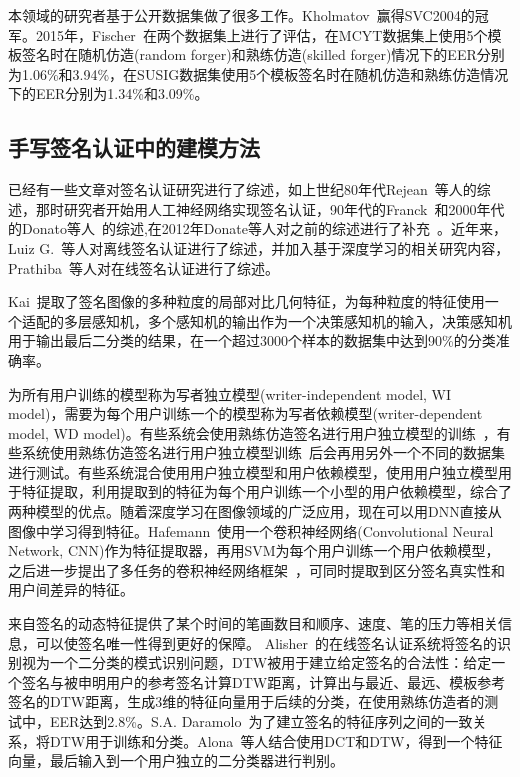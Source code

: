 本领域的研究者基于公开数据集做了很多工作。Kholmatov~\cite{kholmatov2005identity}赢得SVC2004的冠军。2015年，Fischer~\cite{fischer2015robust}在两个数据集上进行了评估，在MCYT数据集上使用5个模板签名时在随机仿造(random forger)和熟练仿造(skilled forger)情况下的EER分别为1.06\%和3.94\%，在SUSIG数据集使用5个模板签名时在随机仿造和熟练仿造情况下的EER分别为1.34\%和3.09\%。

\subsection{手写签名认证中的建模方法}

已经有一些文章对签名认证研究进行了综述，如上世纪80年代Rejean~\cite{plamondon1989automatic}等人的综述，那时研究者开始用人工神经网络实现签名认证，90年代的Franck~\cite{leclerc1994automatic}和2000年代的Donato等人~\cite{impedovo2008automatic}的综述,在2012年Donate等人对之前的综述进行了补充~\cite{impedovo2012handwritten}。近年来，Luiz G.~\cite{hafemann2017offline}等人对离线签名认证进行了综述，并加入基于深度学习的相关研究内容，Prathiba~\cite{prathiba2014online}等人对在线签名认证进行了综述。

Kai~\cite{huang1997off}提取了签名图像的多种粒度的局部对比几何特征，为每种粒度的特征使用一个适配的多层感知机，多个感知机的输出作为一个决策感知机的输入，决策感知机用于输出最后二分类的结果，在一个超过3000个样本的数据集中达到90\%的分类准确率。

为所有用户训练的模型称为写者独立模型(writer-independent model, WI model)，需要为每个用户训练一个的模型称为写者依赖模型(writer-dependent model, WD model)。有些系统会使用熟练仿造签名进行用户独立模型的训练~\cite{rivard2013multi,eskander2013hybrid}，有些系统使用熟练仿造签名进行用户独立模型训练~\cite{yilmaz2016score,rantzsch2016signature,hafemann2017learning}后会再用另外一个不同的数据集进行测试。有些系统混合使用用户独立模型和用户依赖模型，使用用户独立模型用于特征提取，利用提取到的特征为每个用户训练一个小型的用户依赖模型，综合了两种模型的优点。随着深度学习在图像领域的广泛应用，现在可以用DNN直接从图像中学习得到特征。Hafemann~\cite{hafemann2016writer}使用一个卷积神经网络(Convolutional Neural Network, CNN)作为特征提取器，再用SVM为每个用户训练一个用户依赖模型，之后进一步提出了多任务的卷积神经网络框架~\cite{hafemann2017learning}，可同时提取到区分签名真实性和用户间差异的特征。

来自签名的动态特征提供了某个时间的笔画数目和顺序、速度、笔的压力等相关信息，可以使签名唯一性得到更好的保障。 Alisher~\cite{kholmatov2005identity}的在线签名认证系统将签名的识别视为一个二分类的模式识别问题，DTW被用于建立给定签名的合法性：给定一个签名与被申明用户的参考签名计算DTW距离，计算出与最近、最远、模板参考签名的DTW距离，生成3维的特征向量用于后续的分类，在使用熟练仿造者的测试中，EER达到2.8\%。S.A. Daramolo~\cite{daramola2010efficient}为了建立签名的特征序列之间的一致关系，将DTW用于训练和分类。Alona~\cite{levy2018handwritten}等人结合使用DCT和DTW，得到一个特征向量，最后输入到一个用户独立的二分类器进行判别。

